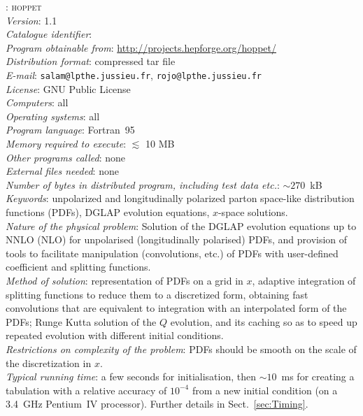 \documentclass[12pt]{article}
\newcommand{\hoppet}{\textsc{hoppet}\xspace}
\begin{document}
: \hoppet \\[2mm]
{\em Version\/}: 1.1 \\[2mm]
{\em Catalogue identifier\/}: \\[2mm]
{\em Program obtainable from\/}:
\url{http://projects.hepforge.org/hoppet/}
\\[2mm]
{\em Distribution format\/}: compressed tar file \\[2mm]
{\em E-mail\/}: {\tt salam@lpthe.jussieu.fr}, 
{\tt rojo@lpthe.jussieu.fr} \\[2mm]
{\em License\/}: GNU Public License \\[2mm]
{\em Computers\/}: all \\[2mm]
{\em Operating systems\/}: all \\[2mm]
{\em Program language\/}: Fortran~95 \\[2mm]
{\em Memory required to execute\/}:  $\lesssim$ 10 MB \\[2mm]
{\em Other programs called\/}: none \\[2mm]
{\em External files needed\/}: none \\[2mm]
{\em Number of bytes in distributed program, including test data
  etc.\/}: $\sim 270$~kB\\[2mm]
{\em Keywords\/}: unpolarized and longitudinally polarized parton
space-like distribution functions (PDFs), DGLAP evolution equations,
$x$-space solutions.
\\[2mm]
{\em Nature of the physical problem\/}: Solution of the DGLAP
evolution equations up to NNLO (NLO) for unpolarised (longitudinally
polarised) PDFs, and provision of tools to facilitate manipulation
(convolutions, etc.) of PDFs with user-defined coefficient and
splitting functions.
\\[2mm]
%
{\em Method of solution\/}:
representation of PDFs on a grid in $x$, adaptive integration of
splitting functions to reduce them to a discretized
form, obtaining fast
convolutions that are equivalent to integration with an interpolated
form of the PDFs; Runge Kutta solution of the $Q$ evolution, and
its caching so as to speed up repeated evolution with different
initial conditions.
\\[2mm]
{\em Restrictions on complexity of the problem\/}: PDFs should be
smooth on the scale of the discretization in $x$.
\\[2mm]
{\em Typical running time\/}: a few seconds for initialisation, then
$\sim 10$~ms for creating a tabulation with a relative accuracy of
$10^{-4}$ from a new initial condition (on a 3.4~GHz Pentium~IV
processor). Further details in Sect.~\ref{sec:Timing}.
\end{document}
